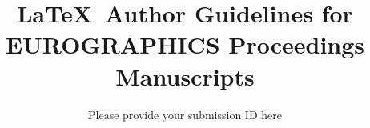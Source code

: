 \documentclass{egpubl-eurovis-short}
\begin{document}



\title[EG \LaTeX\ Author Guidelines]%
      {\LaTeX\ Author Guidelines for EUROGRAPHICS Proceedings Manuscripts}

\author[submission ID]{Please provide your submission ID here}



%
\end{document}
